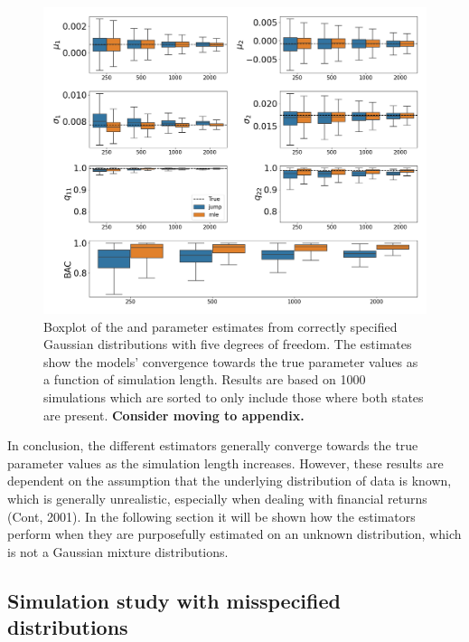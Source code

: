 \begin{figure}[H] 
    \centering
    \includegraphics[width=1\textwidth]{analysis/model_convergence/images/simulation_normal_box_2states.png}
    
    \caption [Boxplot of \mle and \jump parameter estimates from correctly specified conditional Gaussian distributions with five degrees of freedom. Sorted version] {Boxplot of the \mle and \jump parameter estimates from correctly specified Gaussian distributions with five degrees of freedom. The estimates show the models' convergence towards the true parameter values as a function of simulation length. Results are based on 1000 simulations which are sorted to only include those where both states are present. \textbf{Consider moving to appendix.}}
    \label{fig:jump_normal_box_2states}
\end{figure}

In conclusion, the different estimators generally converge towards the true parameter values as the simulation length increases. However, these results are dependent on the assumption that the underlying distribution of data is known, which is generally unrealistic, especially when dealing with financial returns (Cont, 2001). In the following section it will be shown how the estimators perform when they are purposefully estimated on an unknown distribution, which is not a Gaussian mixture distributions. 


\subsection{Simulation study with misspecified distributions}
\label{section:simulation_misspecified}

